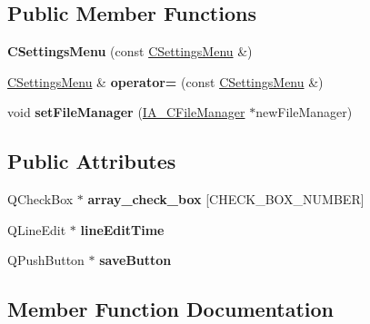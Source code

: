 \subsection*{Public Member Functions}
\begin{DoxyCompactItemize}
\item 
\mbox{\label{classCSettingsMenu_a91833dfcca6380ec51e57cda34a8a45f}} 
{\bfseries C\+Settings\+Menu} (const \hyperlink{classCSettingsMenu}{C\+Settings\+Menu} \&)
\item 
\mbox{\label{classCSettingsMenu_ae82ac53c874530cc1547a12508c3c06e}} 
\hyperlink{classCSettingsMenu}{C\+Settings\+Menu} \& {\bfseries operator=} (const \hyperlink{classCSettingsMenu}{C\+Settings\+Menu} \&)
\item 
\mbox{\label{classCSettingsMenu_aa9d7aa55844a0a7dbb90596196bea35e}} 
void {\bfseries set\+File\+Manager} (\hyperlink{classIA__CFileManager}{I\+A\+\_\+\+C\+File\+Manager} $\ast$new\+File\+Manager)
\end{DoxyCompactItemize}
\subsection*{Public Attributes}
\begin{DoxyCompactItemize}
\item 
\mbox{\label{classCSettingsMenu_af24998dff948b5f70b2308ea78a585d0}} 
Q\+Check\+Box $\ast$ {\bfseries array\+\_\+check\+\_\+box} \mbox{[}C\+H\+E\+C\+K\+\_\+\+B\+O\+X\+\_\+\+N\+U\+M\+B\+ER\mbox{]}
\item 
\mbox{\label{classCSettingsMenu_ade6a28ec659dd1f686851549a1dab469}} 
Q\+Line\+Edit $\ast$ {\bfseries line\+Edit\+Time}
\item 
\mbox{\label{classCSettingsMenu_ab77fdf218f83b3924517a37faa70e5f8}} 
Q\+Push\+Button $\ast$ {\bfseries save\+Button}
\end{DoxyCompactItemize}


\subsection{Member Function Documentation}
\mbox{\label{classCSettingsMenu_ade751a25d60360c8e9931623678f8868}} 
